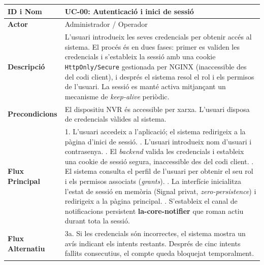 \begin{table}[htbp]
  \centering
  \small
  \begin{tabular}{|l|p{10cm}|}
    \hline
    \rowcolor{backcolour} \textbf{ID i Nom} & \textbf{UC-00: Autenticació i inici de sessió}                                                                                 \\ \hline
    \textbf{Actor}                          & Administrador / Operador                                                                                                       \\ \hline
    \textbf{Descripció}                     & L'usuari introdueix les seves credencials per obtenir accés al sistema. El procés és en dues fases: primer es validen les credencials i s'estableix la sessió amb una cookie \texttt{HttpOnly/Secure} gestionada per NGINX (inaccessible des del codi client), i després el sistema resol el rol i els permisos de l'usuari. La sessió es manté activa mitjançant un mecanisme de \textit{keep-alive} periòdic.                                                     \\ \hline
    \textbf{Precondicions}                  & El dispositiu NVR és accessible per xarxa. L'usuari disposa de credencials vàlides al sistema.                                 \\ \hline
    \textbf{Flux Principal}                 &
    1. L'usuari accedeix a l'aplicació; el sistema redirigeix a la pàgina d'inici de sessió. \newline
    2. L'usuari introdueix nom d'usuari i contrasenya. \newline
    3. El \textit{backend} valida les credencials i estableix una cookie de sessió segura, inaccessible des del codi client. \newline
    4. El sistema consulta el perfil de l'usuari per obtenir el seu rol i els permisos associats (\textit{grants}). \newline
    5. La interfície inicialitza l'estat de sessió en memòria (Signal privat, \textit{zero-persistence}) i redirigeix a la pàgina principal. \newline
    6. S'estableix el canal de notificacions persistent \textbf{la-core-notifier} que roman actiu durant tota la sessió.                                                                                     \\ \hline
    \textbf{Flux Alternatiu}                &
    3a. Si les credencials són incorrectes, el sistema mostra un avís indicant els intents restants. Després de cinc intents fallits consecutius, el compte queda bloquejat temporalment.  \\ \hline

\end{tabular}
\end{table}
